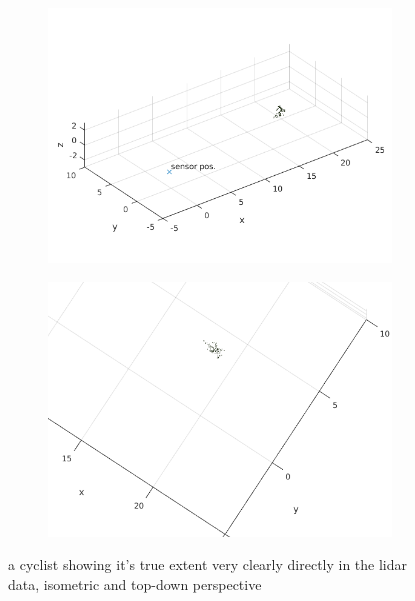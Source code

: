 \begin{figure}[H]
\centering
\begin{subfigure}{.5\textwidth}
  \centering
  \includegraphics[width=1.0\linewidth]{include/images/cycle_extended_target_ex1.png}
\end{subfigure}%
\begin{subfigure}{.5\textwidth}
  \centering
  \includegraphics[width=1.0\linewidth]{include/images/cycle_extended_target_ex2.png}
\end{subfigure}
\caption{a cyclist showing it's true extent very clearly directly in the lidar data, isometric and top-down perspective}
\label{fig:cycle_extended_target}
\end{figure}

